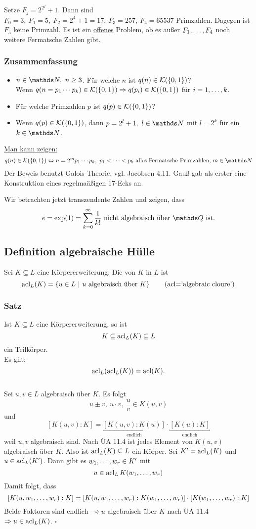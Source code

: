 Setze $F_j=2^{2^j}+1$.
Dann sind $F_0=3,~F_1=5,~F_2=2^4+1=17,~F_3=257,~F_4=65537$ Primzahlen.
Dagegen ist $F_5$ keine Primzahl.
Es ist ein \uline{offenes} Problem, ob es außer $F_1, \dots ,F_4$ noch weitere Fermatsche Zahlen gibt.

\subsubsection*{Zusammenfassung}
\begin{itemize}
	\item $n\in \N,~n\ge3$.
	Für welche $n$ ist $q(n)\in\mathcal{K}(\{0,1\})$?\\
	Wenn $q(n=p_1\cdots p_k)\in \mathcal{K}(\{0,1\})\Rightarrow q(p_i)\in\mathcal{K}(\{0,1\})$ für $i=1, \dots ,k$.
	\item Für welche Primzahlen $p$ ist $q(p)\in\mathcal{K}(\{0,1\})$?
	\item Wenn $q(p)\in\mathcal{K}(\{0,1\})$, dann $p=2^l+1,~l\in\N$ mit $l=2^k$ für ein $k\in\N$.
\end{itemize}
\uline{Man kann zeigen:}
\[
q(n)\in\mc{K}(\{0,1\})\Leftrightarrow n=2^mp_1\cdots p_k,~p_1\dt{<}p_k \text{ alles Fermatsche Primzahlen, }m\in\N
\]
Der Beweis benutzt Galois-Theorie, vgl. Jacobsen 4.11.
Gauß gab als erster eine Konstruktion eines regelmaäßigen 17-Ecks an.

Wir betrachten jetzt transzendente Zahlen und zeigen, dass
\[
e=\exp(1)=\sum_{k=0}^{\infty}\frac{1}{k!} \text{ nicht algebraisch über }\Q\text{ ist.}
\]

\subsection{Definition algebraische Hülle}
\label{sub:alg_huelle}
Sei $K\subseteq L$ eine Körpererweiterung.
Die  von $K$ in $L$ ist
\[
\operatorname{acl}_L(K)=\left\{u\in L~|~ u \text{ algebraisch über }K\right\}\qquad(\text{acl='algebraic cloure'})
\]

\subsubsection*{Satz}
Ist $K\subseteq L$ eine Körpererweiterung, so ist 
\[
K\subseteq \operatorname{acl}_L(K)\subseteq L
\] 
ein Teilkörper.\\
Es gilt:
\[
\operatorname{acl}_L(\operatorname{acl}_L(K))=\operatorname{acl}(K).
\]
\newpage
{}\\
Sei $u,v\in L$ algebraisch über $K$.
Es folgt
\[
u\pm v,~u\cdot v,~\frac{u}{v}\in K(u,v)
\]
und
\[
[K(u,v):K]=\underbracket{[K(u,v):K(u)]}_{\text{endlich}}\cdot \underbracket{[K(u):K]}_{\text{endlich}}
\]
weil $u,v$ algebraisch sind.
Nach ÜA 11.4 ist jedes Element von $K(u,v)$ algebraisch über $K$.
Also ist $\operatorname{acl}_L(K)\subseteq L$ ein Körper.
Sei $K'=\operatorname{acl}_L(K)$ und $u\in \operatorname{acl}_L(K')$.
Dann gibt es $w_1, \dots ,w_r\in K'$ mit
\[
u\in\operatorname{acl}_LK(w_1, \dots ,w_r)
\]
Damit folgt, dass
\[
[K(u,w_1, \dots ,w_r):K]=[K(u,w_1, \dots ,w_r):K(w_1, \dots ,w_r)]\cdot [K(w_1, \dots ,w_r):K]
\]
Beide Faktoren sind endlich $\rightsquigarrow u$ algebraisch über $K$ nach ÜA 11.4 $\Rightarrow u\in\operatorname{acl}_L(K)$.
\hfill $\square$\\

